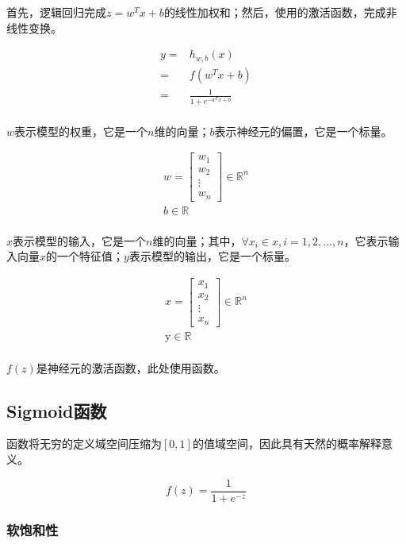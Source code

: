 \begin{content}
首先，逻辑回归完成$z = {w^T}x + b$的线性加权和；然后，使用的激活函数，完成非线性变换。

\[\begin{aligned}
  y =  & {h_{w,b}}(x) \\ 
   =  & f({w^T}x + b) \\ 
   =  & \frac{1}{{1 + {e^{ - {w^T}x + b}}}} \\ 
\end{aligned} \]

$w$表示模型的权重，它是一个$n$维的向量；$b$表示神经元的偏置，它是一个标量。

\[\begin{gathered}
  w = \left[ {\begin{array}{*{20}{c}}
  {{w_1}} \\ 
  {{w_2}} \\ 
   \vdots  \\ 
  {{w_n}} 
\end{array}} \right] \in {\mathbb{R}^n} \\ 
  b \in \mathbb{R} \\ 
\end{gathered} \]

$x$表示模型的输入，它是一个$n$维的向量；其中，$\forall {x_i} \in x,i = 1,2,...,n$，它表示输入向量$x$的一个特征值；$y$表示模型的输出，它是一个标量。

\[\begin{gathered}
  x = \left[ {\begin{array}{*{20}{c}}
  {{x_1}} \\ 
  {{x_2}} \\ 
   \vdots  \\ 
  {{x_n}} 
\end{array}} \right] \in {\mathbb{R}^n} \\ 
  {\text{y}} \in {\mathbb{R}} \\ 
\end{gathered}\]

$f(z)$是神经元的激活函数，此处使用函数。

\subsection{Sigmoid函数}

函数将无穷的定义域空间压缩为$[0, 1]$的值域空间，因此具有天然的概率解释意义。

\[
f(z) = \frac{1}{{1 + {e^{ - z}}}}
\]


\subsubsection{软饱和性}


\end{content}
